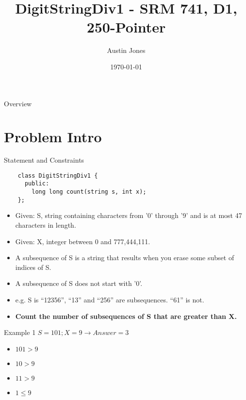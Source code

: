 \documentclass[10pt]{beamer}
\author{Austin Jones}
\title{DigitStringDiv1 \-- SRM 741, D1, 250-Pointer}
\date{\today}
\institute{University of Tennessee \-- Knoxville}
\begin{document}
\maketitle

\begin{frame}{Overview}
  \Large
  \tableofcontents[hideallsubsections]
\end{frame}

\section{Problem Intro}

\begin{frame}[fragile]{Statement and Constraints}
  \begin{verbatim}
    class DigitStringDiv1 {
      public:
        long long count(string s, int x);
    };
  \end{verbatim}
  \begin{itemize}
    \item Given: S, string containing characters from '0' through '9' and is at most 47 characters in length.
    \item Given: X, integer between 0 and 777,444,111.
    \item A subsequence of S is a string that results when you erase some subset of indices of S.
    \item A subsequence of S does not start with '0'.
    \item e.g. S is ``12356'', ``13'' and ``256'' are subsequences. ``61'' is not.
    \item \textbf{Count the number of subsequences of S that are greater than X.}
  \end{itemize}
\end{frame}

\begin{frame}{Example 1}
  \Large
  $S = 101; X = 9 \rightarrow Answer = 3$ \\
  \begin{itemize}[<+->]
    \item $101 > 9$ \only<5>{Here!}
    \item $10 > 9$  
    \item $11 > 9$  
    \item $1 \le 9$
  \end{itemize}
\end{frame}
\end{document}
